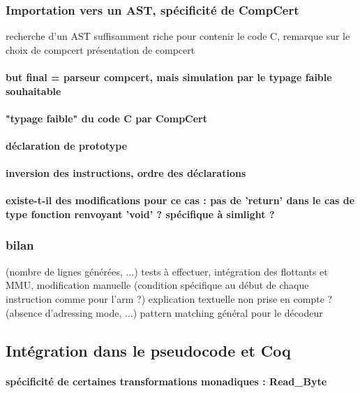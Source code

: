 \documentclass[a4paper, 11pt]{article}
\begin{document}
    \subsubsection{Importation vers un AST, spécificité de CompCert}
recherche d'un AST suffisamment riche pour contenir le code C, remarque sur le choix de compcert
présentation de compcert

      \paragraph{but final = parseur compcert, mais simulation par le typage faible souhaitable}
      \paragraph{"typage faible" du code C par CompCert}
      \paragraph{déclaration de prototype}
      \paragraph{inversion des instructions, ordre des déclarations}
      \paragraph{existe-t-il des modifications pour ce cas : pas de 'return' dans le cas de type fonction renvoyant 'void' ? spécifique à simlight ?}


    \subsubsection{bilan} 
      (nombre de lignes générées, ...)
      tests à effectuer, intégration des flottants et MMU, modification manuelle (condition spécifique au début de chaque instruction comme pour l'arm ?) explication textuelle non prise en compte ?
 (absence d'adressing mode, ...)
pattern matching général pour le décodeur

  \subsection{Intégration dans le pseudocode et Coq}
      \paragraph{spécificité de certaines transformations monadiques : Read\_Byte}
\end{document}
